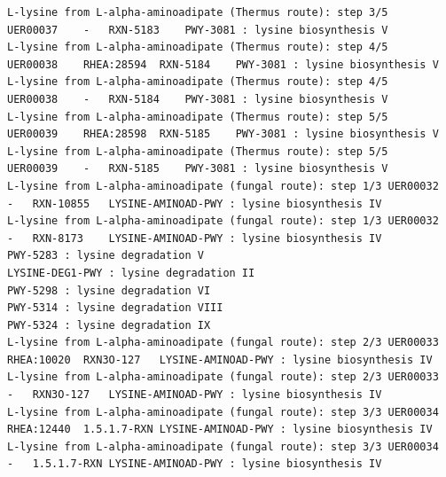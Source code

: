 \begin{adjustbox}{width=\textwidth}
\begin{lstlisting}[basicstyle=\tiny\normalfont\ttfamily,tabsize=2,showtabs=true,caption=AAA\_uer\_metacyc.tsv]
L-lysine from L-alpha-aminoadipate (Thermus route): step 3/5	UER00037	-	RXN-5183	PWY-3081 : lysine biosynthesis V 
L-lysine from L-alpha-aminoadipate (Thermus route): step 4/5	UER00038	RHEA:28594	RXN-5184	PWY-3081 : lysine biosynthesis V 
L-lysine from L-alpha-aminoadipate (Thermus route): step 4/5	UER00038	-	RXN-5184	PWY-3081 : lysine biosynthesis V 
L-lysine from L-alpha-aminoadipate (Thermus route): step 5/5	UER00039	RHEA:28598	RXN-5185	PWY-3081 : lysine biosynthesis V 
L-lysine from L-alpha-aminoadipate (Thermus route): step 5/5	UER00039	-	RXN-5185	PWY-3081 : lysine biosynthesis V 
L-lysine from L-alpha-aminoadipate (fungal route): step 1/3	UER00032	-	RXN-10855	LYSINE-AMINOAD-PWY : lysine biosynthesis IV 
L-lysine from L-alpha-aminoadipate (fungal route): step 1/3	UER00032	-	RXN-8173	LYSINE-AMINOAD-PWY : lysine biosynthesis IV 
PWY-5283 : lysine degradation V 
LYSINE-DEG1-PWY : lysine degradation II 
PWY-5298 : lysine degradation VI 
PWY-5314 : lysine degradation VIII 
PWY-5324 : lysine degradation IX 
L-lysine from L-alpha-aminoadipate (fungal route): step 2/3	UER00033	RHEA:10020	RXN3O-127	LYSINE-AMINOAD-PWY : lysine biosynthesis IV 
L-lysine from L-alpha-aminoadipate (fungal route): step 2/3	UER00033	-	RXN3O-127	LYSINE-AMINOAD-PWY : lysine biosynthesis IV 
L-lysine from L-alpha-aminoadipate (fungal route): step 3/3	UER00034	RHEA:12440	1.5.1.7-RXN	LYSINE-AMINOAD-PWY : lysine biosynthesis IV 
L-lysine from L-alpha-aminoadipate (fungal route): step 3/3	UER00034	-	1.5.1.7-RXN	LYSINE-AMINOAD-PWY : lysine biosynthesis IV 
\end{lstlisting}
\end{adjustbox}

